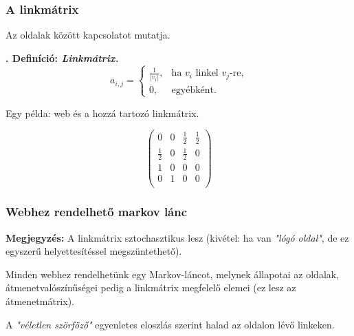 \documentclass[]{beamer}
\newcounter{definicioszam}
\newenvironment{definicio}[1]
{{\medskip}\noindent \stepcounter{definicioszam}
{\bfseries{\thedefinicioszam. Definíció: \textit{#1.}}}}{\bigskip }
\begin{document}
\begin{frame}
	\frametitle{A linkmátrix}
	
	Az oldalak között kapcsolatot mutatja.
	
	\begin{definicio}{Linkmátrix}
		\begin{equation*}
		a_{i,j}=\begin{cases}
		\frac{1}{ |v_i| }, & \text{ha $v_i$ linkel $v_j$-re,}\\
		0, & \text{egyébként}.
		\end{cases}
		\end{equation*}
	\end{definicio}

Egy példa: web és a hozzá tartozó linkmátrix.
\begin{minipage}{0.4\textwidth}
	\centering
	\begin{center}
	\end{center}
\end{minipage}
\begin{minipage}{0.5\textwidth}
	\begin{center}
		\[
		\begin{pmatrix}
		0 & 0 & \frac{1}{2} & \frac{1}{2} \\  
		\frac{1}{2} & 0 & \frac{1}{2} & 0 \\
		1 & 0 & 0 & 0 \\
		0 & 1 & 0 & 0 \\
		\end{pmatrix}
		\]
	\end{center}
\end{minipage}
\end{frame}

\begin{frame}
	\frametitle{Webhez rendelhető markov lánc}
	
	\textbf{Megjegyzés:} A linkmátrix sztochasztikus lesz (kivétel: ha van \textit{"lógó oldal"}, de ez egyszerű helyettesítéssel megszüntethető).
	
	\bigskip
	
	Minden webhez rendelhetünk egy Markov-láncot, melynek állapotai az oldalak, átmenetvalószínűségei pedig a linkmátrix megfelelő elemei (ez lesz az átmenetmátrix). 
	
	\bigskip
	
	A \textit{"véletlen szörföző"} egyenletes eloszlás szerint halad az oldalon lévő linkeken. 
\end{frame}
\end{document}
